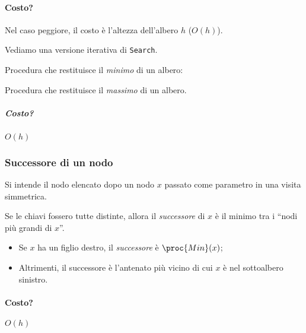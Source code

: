 

\paragraph{Costo?} Nel caso peggiore, il costo è l'altezza dell'albero $h$ ($O(h)$).

\bigskip
Vediamo una versione iterativa di \texttt{Search}.


Procedura che restituisce il \emph{minimo} di un albero:


Procedura che restituisce il \emph{massimo} di un albero.


\subparagraph{Costo?} $O(h)$

\subsubsection{Successore di un nodo}
Si intende il nodo elencato dopo un nodo $x$ passato come parametro in una visita simmetrica.

Se le chiavi fossero tutte distinte, allora il \emph{successore} di $x$ 
è il minimo tra i ``nodi più grandi di $x$''.
\begin{itemize}
	\item Se $x$ ha un figlio destro, il \emph{successore} è $\proc{Min}(x)$;
	\item Altrimenti, il successore è l'antenato più vicino di cui $x$ è nel 
	sottoalbero sinistro.
\end{itemize}


\paragraph{Costo?} $O(h)$